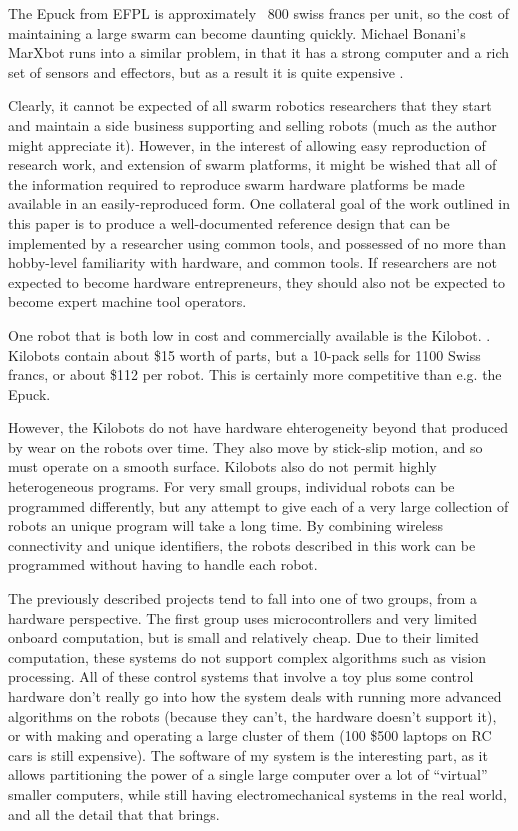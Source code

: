 \documentclass[]{article}
\begin{document}
The Epuck from EFPL is approximately ~800 swiss francs per unit, so the cost of maintaining a large swarm can become daunting quickly. Michael Bonani's MarXbot runs into a similar problem, in that it has a strong computer and a rich set of sensors and effectors, but as a result it is quite expensive \cite{bonani2010marxbot}.

Clearly, it cannot be expected of all swarm robotics researchers that they start and maintain a side business supporting and selling robots (much as the author might appreciate it).
However, in the interest of allowing easy reproduction of research work, and extension of swarm platforms, it might be wished that all of the information required to reproduce swarm hardware platforms be made available in an easily-reproduced form.
One collateral goal of the work outlined in this paper is to produce a well-documented reference design that can be implemented by a researcher using common tools, and possessed of no more than hobby-level familiarity with hardware, and common tools. 
If researchers are not expected to become hardware entrepreneurs, they should also not be expected to become expert machine tool operators. 

One robot that is both low in cost and commercially available is the Kilobot. \cite{rubenstein2014kilobot}. Kilobots contain about \$15 worth of parts, but a 10-pack sells for 1100 Swiss francs, or about \$112 per robot. This is certainly more competitive than e.g. the Epuck. 

However, the Kilobots do not have hardware ehterogeneity beyond that produced by wear on the robots over time. They also move by stick-slip motion, and so must operate on a smooth surface. Kilobots also do not permit highly heterogeneous programs. For very small groups, individual robots can be programmed differently, but any attempt to give each of a very large collection of robots an unique program will take a long time. By combining wireless connectivity and unique identifiers, the robots described in this work can be programmed without having to handle each robot. 

The previously described projects tend to fall into one of two groups, from a hardware perspective. The first group uses microcontrollers and very limited onboard computation, but is small and relatively cheap. Due to their limited computation, these systems do not support complex algorithms such as vision processing. 
All of these control systems that involve a toy plus some control hardware don't really go into how the system deals with running more advanced algorithms on the robots (because they can't, the hardware doesn't support it), or with making and operating a large cluster of them (100 \$500 laptops on RC cars is still expensive). The software of my system is the interesting part, as it allows partitioning the power of a single large computer over a lot of ``virtual'' smaller computers, while still having electromechanical systems in the real world, and all the detail that that brings.
\end{document}
